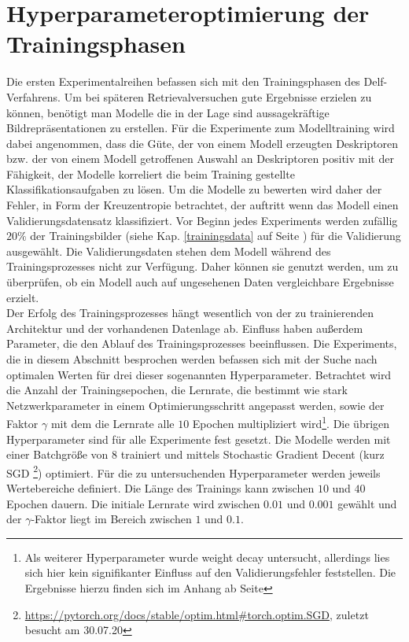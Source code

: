 \section{Hyperparameteroptimierung der Trainingsphasen}
Die ersten Experimentalreihen befassen sich mit den Trainingsphasen des Delf-Verfahrens. Um bei späteren Retrievalversuchen gute Ergebnisse erzielen zu können, benötigt man Modelle die in der Lage sind aussagekräftige Bildrepräsentationen zu erstellen. Für die Experimente zum Modelltraining wird dabei angenommen, dass die Güte, der von einem Modell erzeugten Deskriptoren bzw. der von einem Modell getroffenen Auswahl an Deskriptoren positiv mit der Fähigkeit, der Modelle korreliert die beim Training gestellte Klassifikationsaufgaben zu lösen. Um die Modelle zu bewerten wird daher der Fehler, in Form der Kreuzentropie betrachtet, der auftritt wenn das Modell einen Validierungsdatensatz klassifiziert. Vor Beginn jedes Experiments werden zufällig $20\%$ der Trainingsbilder (siehe Kap. \ref{trainingsdata} auf Seite \pageref{trainingsdata}) für die Validierung ausgewählt. Die Validierungsdaten stehen dem Modell während des Trainingsprozesses nicht zur Verfügung. Daher können sie genutzt werden, um zu überprüfen, ob ein Modell auch auf ungesehenen Daten vergleichbare Ergebnisse erzielt.
\\
Der Erfolg des Trainingsprozesses hängt wesentlich von der zu trainierenden Architektur und der vorhandenen Datenlage ab. Einfluss haben außerdem Parameter, die den Ablauf des Trainingsprozesses beeinflussen. Die Experiments, die in diesem Abschnitt besprochen werden befassen sich mit der Suche nach optimalen Werten für drei dieser sogenannten Hyperparameter. Betrachtet wird die Anzahl der Trainingsepochen, die Lernrate, die bestimmt wie stark Netzwerkparameter in einem Optimierungsschritt angepasst werden, sowie der Faktor $\gamma$ mit dem die Lernrate alle $10$ Epochen multipliziert wird\footnote{Als weiterer Hyperparameter wurde weight decay untersucht, allerdings lies sich hier kein signifikanter Einfluss auf den Validierungsfehler feststellen. Die Ergebnisse hierzu finden sich im Anhang ab Seite \pageref{weight_decay}}. Die übrigen Hyperparameter sind für alle Experimente fest gesetzt. Die Modelle werden mit einer Batchgröße von $8$ trainiert und mittels Stochastic Gradient Decent (kurz SGD \footnote{\url{https://pytorch.org/docs/stable/optim.html\#torch.optim.SGD}, zuletzt besucht am 30.07.20}) optimiert. Für die zu untersuchenden Hyperparameter werden jeweils Wertebereiche definiert. Die Länge des Trainings kann zwischen $10$ und $40$ Epochen dauern. Die initiale Lernrate wird zwischen $0.01$ und $0.001$ gewählt und der $\gamma$-Faktor liegt im Bereich zwischen $1$ und $0.1$.

